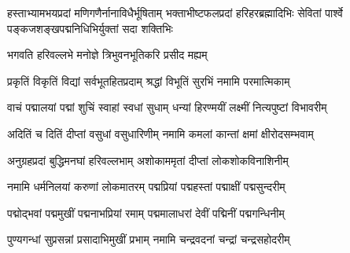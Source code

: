 
%
%
%
%

{हस्ताभ्यामभयप्रदां मणिगणैर्नानाविधैर्भूषिताम्}
{भक्ताभीष्टफलप्रदां हरिहरब्रह्मादिभिः सेवितां}
{पार्श्वे पङ्कजशङ्खपद्मनिधिभिर्युक्तां सदा शक्तिभिः}

{भगवति हरिवल्लभे मनोज्ञे त्रिभुवनभूतिकरि प्रसीद मह्यम्}

\resetShloka
\twolineshloka
{प्रकृतिं विकृतिं विद्यां सर्वभूतहितप्रदाम्}
{श्रद्धां विभूतिं सुरभिं नमामि परमात्मिकाम्}

\twolineshloka
{वाचं पद्मालयां पद्मां शुचिं स्वाहां स्वधां सुधाम्}
{धन्यां हिरण्मयीं लक्ष्मीं नित्यपुष्टां विभावरीम्}

\twolineshloka
{अदितिं च दितिं दीप्तां वसुधां वसुधारिणीम्}
{नमामि कमलां कान्तां क्षमां क्षीरोदसम्भवाम्}

\twolineshloka
{अनुग्रहप्रदां बुद्धिमनघां हरिवल्लभाम्}
{अशोकाममृतां दीप्तां लोकशोकविनाशिनीम्}

\twolineshloka
{नमामि धर्मनिलयां करुणां लोकमातरम्}
{पद्मप्रियां पद्महस्तां पद्माक्षीं पद्मसुन्दरीम्}

\twolineshloka
{पद्मोद्भवां पद्ममुखीं पद्मनाभप्रियां रमाम्}
{पद्ममालाधरां देवीं पद्मिनीं पद्मगन्धिनीम्}

\twolineshloka
{पुण्यगन्धां सुप्रसन्नां प्रसादाभिमुखीं प्रभाम्}
{नमामि चन्द्रवदनां चन्द्रां चन्द्रसहोदरीम्}

